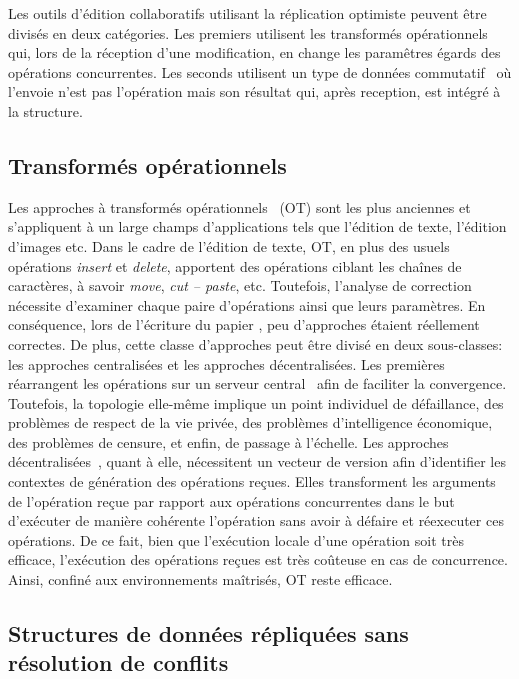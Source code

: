 Les outils d'édition collaboratifs utilisant la réplication optimiste peuvent
être divisés en deux catégories. Les premiers utilisent les transformés
opérationnels~\cite{sun2009contextbased, sun1998operational} qui, lors de la
réception d'une modification, en change les paramêtres égards des opérations
concurrentes. Les seconds utilisent un type de données
commutatif~\cite{shapiro2011comprehensive, shapiro2011conflict} où l'envoie
n'est pas l'opération mais son résultat qui, après reception, est intégré à la
structure. 

\subsection{Transformés opérationnels}

Les approches à transformés opérationnels~\cite{sun2009contextbased,
  sun1998operational} (OT) sont les plus anciennes et s'appliquent à un large
champs d'applications tels que l'édition de texte, l'édition d'images etc. Dans
le cadre de l'édition de texte, OT, en plus des usuels opérations \emph{insert}
et \emph{delete}, apportent des opérations ciblant les chaînes de caractères, à
savoir \emph{move}, \emph{cut -- paste}, etc. Toutefois, l'analyse de correction
nécessite d'examiner chaque paire d'opérations ainsi que leurs paramètres. En
conséquence, lors de l'écriture du papier \cite{imine2003proving}, peu
d'approches étaient réellement correctes. De plus, cette classe d'approches peut
être divisé en deux sous-classes: les approches centralisées et les approches
décentralisées. Les premières réarrangent les opérations sur un serveur
central~\cite{nichols1995high} afin de faciliter la convergence. Toutefois, la
topologie elle-même implique un point individuel de défaillance, des problèmes
de respect de la vie privée, des problèmes d'intelligence économique, des
problèmes de censure, et enfin, de passage à l'échelle. Les approches
décentralisées~\cite{sun2009contextbased}, quant à elle, nécessitent un vecteur
de version afin d'identifier les contextes de génération des opérations
reçues. Elles transforment les arguments de l'opération reçue par rapport aux
opérations concurrentes dans le but d'exécuter de manière cohérente l'opération
sans avoir à défaire et réexecuter ces opérations. De ce fait, bien que
l'exécution locale d'une opération soit très efficace, l'exécution des
opérations reçues est très coûteuse en cas de concurrence. Ainsi, confiné aux
environnements maîtrisés, OT reste efficace.

\subsection{Structures de données répliquées sans résolution de conflits}

